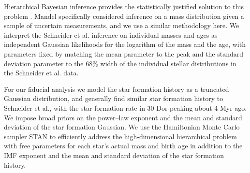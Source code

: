 \documentclass[12pt]{article}
\begin{document}


Hierarchical Bayesian inference provides the statistically justified solution to
this problem \cite{Hogg:2010}.  Mandel\cite{Mandel:2010stat} specifically considered
inference on a mass distribution given a sample of uncertain measurements, and
we use a similar methodology here.  We interpret the Schneider et al.\cite{Schneider:2018}
inference on individual masses and ages as independent Gaussian likelihoods for
the logarithm of the mass and the age, with parameters fixed by matching the mean
parameter to the peak and the standard deviation parameter to the 68\% width of
the individual stellar distributions in the Schneider et al.\cite{Schneider:2018} data.  

For our fiducial analysis we model the star formation history as a truncated Gaussian distribution, and
generally find similar star formation history to Schneider et al.\cite{Schneider:2018}, with
the star formation rate in 30 Dor peaking about 4 Myr ago.  We impose broad priors
on the power--law exponent and the mean and standard deviation of the star
formation Gaussian.    We use the Hamiltonian Monte Carlo sampler STAN
\cite{STAN} to efficiently address the high-dimensional hierarchical problem
with free parameters for each star's actual mass and birth age in addition to
the IMF exponent and the mean and standard deviation of the star formation
history.
\end{document}
